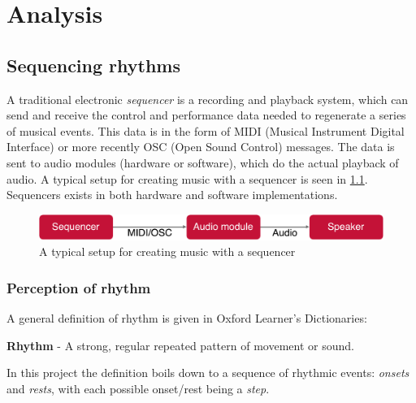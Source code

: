 \chapter{Analysis}

\section{Sequencing rhythms}

A traditional electronic \textit{sequencer} is a recording and playback system, which can send and receive the control and performance data needed to regenerate a series of musical events\cite{roads}. This data is in the form of MIDI (Musical Instrument Digital Interface) or more recently OSC (Open Sound Control) messages. The data is sent to audio modules (hardware or software), which do the actual playback of audio. A typical setup for creating music with a sequencer is seen in \cref{fig:sequencer_desc}. Sequencers exists in both hardware and software implementations.

\begin{figure}[H]
    \centering
    \includegraphics[width=\textwidth]{graphics/sequencer_desc.pdf}
    \caption{A typical setup for creating music with a sequencer}
    \label{fig:sequencer_desc}
\end{figure}

\subsection{Perception of rhythm}
\label{sec:perception}
A general definition of rhythm is given in Oxford Learner's Dictionaries:

\begin{displayquote}
    \textbf{Rhythm} - A strong, regular repeated pattern of movement or sound.
\end{displayquote}

In this project the definition boils down to a sequence of rhythmic events: \textit{onsets} and \textit{rests}, with each possible onset/rest being a \textit{step}. 

